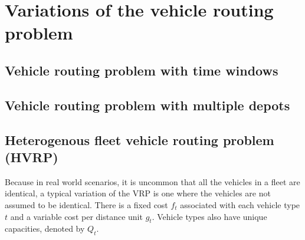  


\section{Variations of the vehicle routing problem}
\subsection{Vehicle routing problem with time windows}
\subsection{Vehicle routing problem with multiple depots}

\subsection{Heterogenous fleet vehicle routing problem (HVRP)}

Because in real world scenarios, it is uncommon that all the vehicles in a fleet are identical, a typical variation of the VRP is one where the vehicles are not assumed to be identical. There is a fixed cost $f_t$ associated with each vehicle type $t$ and a variable cost per distance unit $g_t$. Vehicle types also have unique capacities, denoted by $Q_t$. \cite{gendreau1999tabu}